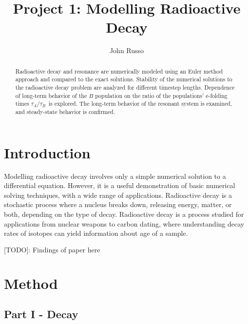 \documentclass[pra,twocolumn,showpacs,amsmath,amssymb]{revtex4-1}
\begin{document}
\newcommand{\trel}{$\tau_A / \tau_B$}

\title{Project 1: Modelling Radioactive Decay}


\author{John Russo}

\begin{abstract}
Radioactive decay and resonance are numerically modeled using an Euler method
approach and compared to the exact solutions.
Stability of the numerical solutions to the radioactive decay problem are analyzed
for different timestep lengths. Dependence of long-term behavior of the $B$
population on the ratio of the populations' e-folding times \trel~is explored.
The long-term behavior of the resonant system is examined, and steady-state
behavior is confirmed.
\end{abstract}



\maketitle





\section{Introduction} \label{sec:intro}

Modelling radioactive decay involves only a simple numerical solution to a
differential equation. However, it is a useful demonstration of basic numerical
solving techniques, with a wide range of applications.
Radioactive decay is a stochastic process where a nucleus breaks down, releasing
energy, matter, or both, depending on the type of decay.
Radioactive decay is a process studied for applications from nuclear weapons to
carbon dating, where understanding decay rates of isotopes can yield information
about age of a sample.

[TODO]: Findings of paper here



\section{Method}

\subsection{Part I - Decay}
\end{document}
